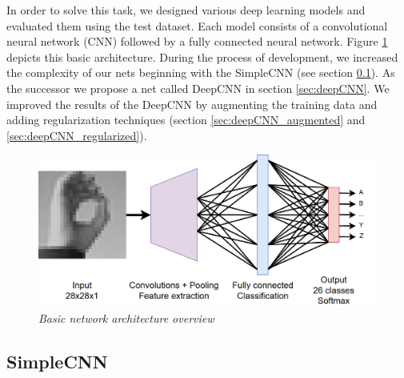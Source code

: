 \documentclass[a4paper]{article}
\begin{document}
In order to solve this task, we designed various deep learning models and evaluated them using the test dataset. Each model consists of a convolutional neural network (CNN) followed by a fully connected neural network. Figure \ref{fig:basic_arch} depicts this basic architecture. During the process of development, we increased the complexity of our nets beginning with the SimpleCNN (see section \ref{sec:simpleCNN}). As the successor we propose a net called  DeepCNN in section \ref{sec:deepCNN}. We improved the results of the DeepCNN by augmenting the training data and adding regularization techniques (section \ref{sec:deepCNN_augmented} and \ref{sec:deepCNN_regularized}).

\begin{figure}
     \centering
     \includegraphics[width=1\linewidth]{graphics/basic_net_with_text.png}
     \caption{\textit{Basic network architecture overview}}
     \label{fig:basic_arch}
\end{figure}

\subsection{SimpleCNN}\label{sec:simpleCNN}
\end{document}
